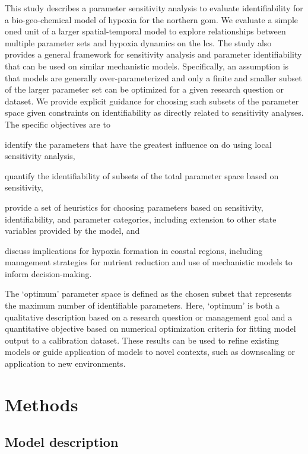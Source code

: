 \documentclass[letterpaper,12pt,oneside]{article}\usepackage[]{graphicx}\usepackage[]{color}
\begin{document}
This study describes a parameter sensitivity analysis to evaluate identifiability for a bio-geo-chemical model of hypoxia for the northern \ac{gom}.  We evaluate a simple \ac{oned} unit of a larger spatial-temporal model to explore relationships between multiple parameter sets and hypoxia dynamics on the \ac{lcs}.  The study also provides a general framework for sensitivity analysis and parameter identifiability that can be used on similar mechanistic models.  Specifically, an assumption is that models are generally over-parameterized and only a finite and smaller subset of the larger parameter set can be optimized for a given research question or dataset.  We provide explicit guidance for choosing such subsets of the parameter space given constraints on identifiability as directly related to sensitivity analyses.  The specific objectives are to \begin{inparaenum}[1\upshape)]
\item identify the parameters that have the greatest influence on \ac{do} using local sensitivity analysis,
\item quantify the identifiability of subsets of the total parameter space based on sensitivity,
\item provide a set of heuristics for choosing parameters based on sensitivity, identifiability, and parameter categories, including extension to other state variables provided by the model, and 
\item discuss implications for hypoxia formation in coastal regions, including management strategies for nutrient reduction and use of mechanistic models to inform decision-making.
\end{inparaenum}
The `optimum' parameter space is defined as the chosen subset that represents the maximum number of identifiable parameters.  Here, `optimum' is both a qualitative description based on a research question or management goal and a quantitative objective based on numerical optimization criteria for fitting model output to a calibration dataset.  These results can be used to refine existing models or guide application of models to novel contexts, such as downscaling or application to new environments. 

\section{Methods}

\subsection{Model description}
\end{document}

